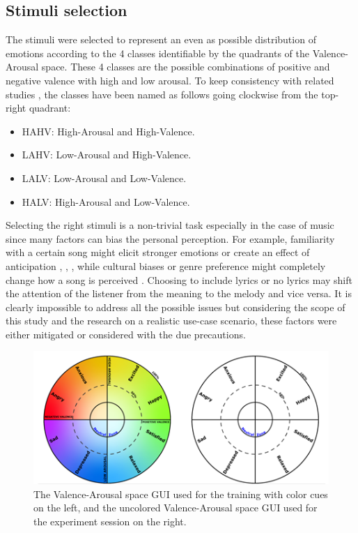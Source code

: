 \subsection{Stimuli selection}
\label{sec:stimuli}
The stimuli were selected to represent an even as possible distribution of emotions according to the 4 classes identifiable by the quadrants of the Valence-Arousal space. These 4 classes are the possible combinations of positive and negative valence with high and low arousal. To keep consistency with related studies \cite{koelstra_deap_2012}, the classes have been named as follows going clockwise from the top-right quadrant:
\begin{itemize}
\item HAHV: High-Arousal and High-Valence.
\item LAHV: Low-Arousal and High-Valence.
\item LALV: Low-Arousal and Low-Valence.
\item HALV: High-Arousal and Low-Valence.
\end{itemize}
Selecting the right stimuli is a non-trivial task especially in the case of music since many factors can bias the personal perception. For example, familiarity with a certain song might elicit stronger emotions or create an effect of anticipation \cite{sangnark_revealing_2021}, \cite{ward_same_2013}, \cite{salimpoor_anatomically_2011}, while cultural biases or genre preference might completely change how a song is perceived \cite{chang_personalized_2017,fang_perception_2017}. Choosing to include lyrics or no lyrics may shift the attention of the listener from the meaning to the melody and vice versa. It is clearly impossible to address all the possible issues but considering the scope of this study and the research on a realistic use-case scenario, these factors were either mitigated or considered with the due precautions. 

\begin{figure}[h!]
\includegraphics[width=12cm]{img/methods/va_space_experiment.png}
\centering
\caption{The Valence-Arousal space GUI used for the training with color cues on the left, and the uncolored Valence-Arousal space GUI used for the experiment session on the right.} \label{fig_va_space_experiment}
\end{figure}

